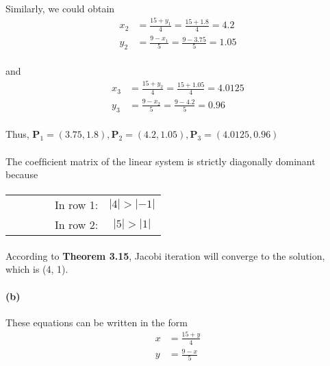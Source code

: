 \documentclass{article}  %
\begin{document}
        \paragraph{}Similarly, we could obtain 
        \begin{align*}
            x_{2} &= \frac{15 + y_1}{4} = \frac{15 + 1.8}{4} = 4.2 \\
            y_{2} &= \frac{9 - x_1}{5} = \frac{9 - 3.75}{5} = 1.05
        \end{align*}
        \paragraph{}and
        \begin{align*}
            x_{3} &= \frac{15 + y_2}{4} = \frac{15 + 1.05}{4} = 4.0125 \\
            y_{3} &= \frac{9 - x_2}{5} = \frac{9 - 4.2}{5} = 0.96
        \end{align*}
        \paragraph{}Thus, $\bm{P}_1 = (3.75, 1.8), \bm{P}_2 = (4.2, 1.05), \bm{P}_3 = (4.0125, 0.96)$
        \paragraph{}The coefﬁcient matrix of the linear system is strictly diagonally dominant because
        \paragraph{}
        \renewcommand\tabcolsep{12.0pt} %
        \begin{threeparttable} %
            \begin{tabular}{cccccc} 
             & & & & In row 1: & $|4| > |-1|$ \\
             & & & & In row 2: & $|5| > |1|$
            \end{tabular} 
        \end{threeparttable}
        \paragraph{}According to \textbf{Theorem 3.15}, Jacobi iteration will converge to the solution, which is (4, 1).
        \paragraph{(b)}These equations can be written in the form
        \begin{align*}
            x &= \frac{15 + y}{4} \\
            y &= \frac{9 - x}{5}
        \end{align*}
\end{document}

